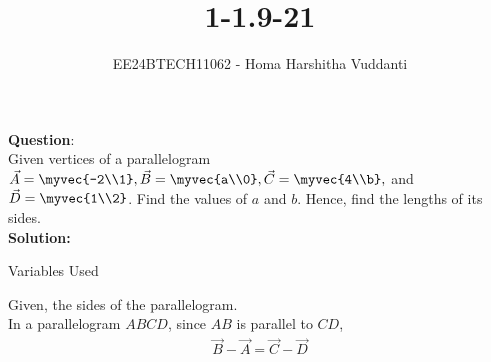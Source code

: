 \documentclass[journal]{IEEEtran}
\begin{document}

\vspace{3cm}

\title{1-1.9-21}
\author{EE24BTECH11062 - Homa Harshitha Vuddanti
}
{\let\newpage\relax\maketitle}

\renewcommand{\thefigure}{\theenumi}
\renewcommand{\thetable}{\theenumi}
\setlength{\intextsep}{10pt} %


\renewcommand{\thetable}{\theenumi}


\textbf{Question}:\\
Given vertices of a parallelogram $\vec{A}=\myvec{-2\\1}, \vec{B}=\myvec{a\\0}, \vec{C}=\myvec{4\\b},$ and $\vec{D}=\myvec{1\\2}$. Find the values of $a$ and $b$. Hence, find the lengths of its sides.
\\
\textbf{Solution: }\\
\begin{table}[h!]    
  \centering
  
  \caption{Variables Used}
  \label{1-1.9-21-table}
\end{table}
Given, the sides of the parallelogram.\\In a parallelogram $ABCD$, 
since $AB$ is parallel to $CD$,
\begin{align}
    \vec{B}-\vec{A}=\vec{C}-\vec{D}
\end{align}
\end{document}
